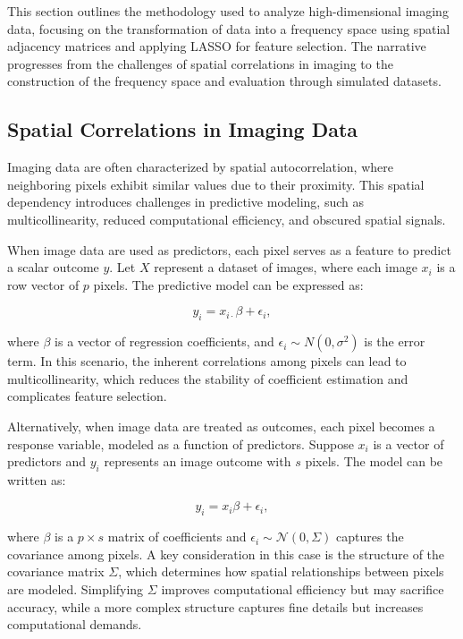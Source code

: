 \documentclass[12pt]{article}
\begin{document}
This section outlines the methodology used to analyze high-dimensional imaging data, focusing on the transformation of data into a frequency space using spatial adjacency matrices and applying LASSO for feature selection. The narrative progresses from the challenges of spatial correlations in imaging to the construction of the frequency space and evaluation through simulated datasets.


\subsection{Spatial Correlations in Imaging Data}

Imaging data are often characterized by spatial autocorrelation, where neighboring pixels exhibit similar values due to their proximity. This spatial dependency introduces challenges in predictive modeling, such as multicollinearity, reduced computational efficiency, and obscured spatial signals.

When image data are used as predictors, each pixel serves as a feature to predict a scalar outcome \( y \). Let \( X \) represent a dataset of images, where each image \( x_i \) is a row vector of \( p \) pixels. The predictive model can be expressed as:

\[
  y_i = x_{i \cdot} \beta + \epsilon_i,
\]

where \( \beta \) is a vector of regression coefficients, and \( \epsilon_i \sim N (0, \sigma^2) \) is the error term. In this scenario, the inherent correlations among pixels can lead to multicollinearity, which reduces the stability of coefficient estimation and complicates feature selection.

Alternatively, when image data are treated as outcomes, each pixel becomes a response variable, modeled as a function of predictors. Suppose \( x_i \) is a vector of predictors and \( y_i \) represents an image outcome with \( s \) pixels. The model can be written as:

\[
y_i = x_i \beta + \epsilon_i,
\]

where \( \beta \) is a \( p \times s \) matrix of coefficients and \( \epsilon_i \sim \mathcal{N}(0, \Sigma) \) captures the covariance among pixels. A key consideration in this case is the structure of the covariance matrix \( \Sigma \), which determines how spatial relationships between pixels are modeled. Simplifying \( \Sigma \) improves computational efficiency but may sacrifice accuracy, while a more complex structure captures fine details but increases computational demands.
\end{document}
